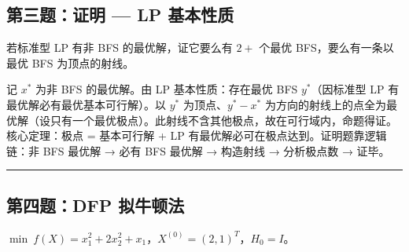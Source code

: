 \subsection*{第三题：证明 — LP 基本性质}

\noindent 若标准型 LP 有非 BFS 的最优解，证它要么有 $2+$ 个最优 BFS，要么有一条以最优 BFS 为顶点的射线。

  {记 $x^*$ 为非 BFS 的最优解。由 LP 基本性质：存在最优 BFS $y^*$（因标准型 LP 有最优解必有最优基本可行解）。以 $y^*$ 为顶点、$y^*-x^*$ 为方向的射线上的点全为最优解（设只有一个最优极点）。此射线不含其他极点，故在可行域内，命题得证。}
  {核心定理：极点 = 基本可行解 + LP 有最优解必可在极点达到。证明题靠逻辑链：非 BFS 最优解 → 必有 BFS 最优解 → 构造射线 → 分析极点数 → 证毕。}
  {\par\vspace{4pt}\par\vspace{4pt}}\rule{\textwidth}{0.4pt}

\subsection*{第四题：DFP 拟牛顿法}

\noindent $\min\ f(X) = x_1^2 + 2x_2^2 + x_1$，$X^{(0)}=(2,1)^T$，$H_0=I$。

